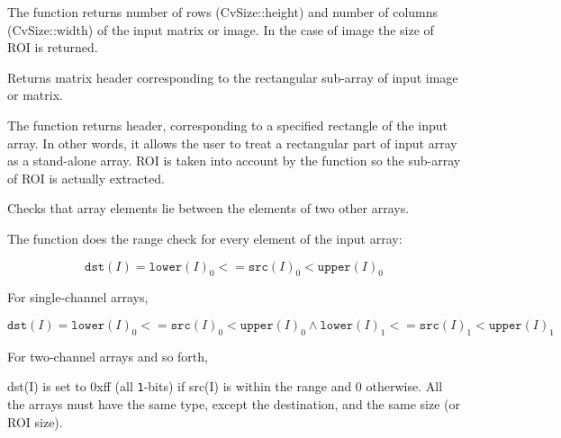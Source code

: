 The function returns number of rows (CvSize::height) and number of columns (CvSize::width) of the input matrix or image. In the case of image the size of ROI is returned.


Returns matrix header corresponding to the rectangular sub-array of input image or matrix.


\begin{description}
\ifC
{}
\fi
{}
\end{description}

The function returns header, corresponding to
a specified rectangle of the input array. In other words, it allows
the user to treat a rectangular part of input array as a stand-alone
array. ROI is taken into account by the function so the sub-array of
ROI is actually extracted.

Checks that array elements lie between the elements of two other arrays.


\begin{description}
\end{description}


The function does the range check for every element of the input array:

\[
\texttt{dst}(I)=\texttt{lower}(I)_0 <= \texttt{src}(I)_0 < \texttt{upper}(I)_0
\]

For single-channel arrays,

\[
\texttt{dst}(I)=
\texttt{lower}(I)_0 <= \texttt{src}(I)_0 < \texttt{upper}(I)_0 \land
\texttt{lower}(I)_1 <= \texttt{src}(I)_1 < \texttt{upper}(I)_1
\]

For two-channel arrays and so forth,

dst(I) is set to 0xff (all \texttt{1}-bits) if src(I) is within the range and 0 otherwise. All the arrays must have the same type, except the destination, and the same size (or ROI size).


